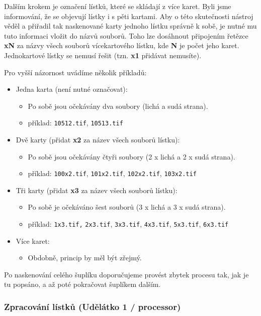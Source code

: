 Dalším krokem je označení lístků, které se skládají z více karet. Byli jsme informování, že se objevují lístky i s pěti kartami. Aby o této skutečnosti nástroj věděl a přiřadil tak naskenované karty jednoho lístku správně k sobě, je nutné mu tuto informaci vložit do názvů souborů. Toho lze dosáhnout připojením řetězce {\bf xN} za názvy všech souborů vícekartového lístku, kde {\bf N} je počet jeho karet. Jednokartové lístky se nemusí řešit (tzn. {\bf x1} přidávat nemusíte).

Pro vyšší názornost uvádíme několik příkladů:

\begin{itemize}
\item{Jedna karta (není nutné označovat):}
\begin{itemize}
\item{Po sobě jsou očekávány dva soubory (lichá a sudá strana).}
\item{příklad: {\tt 10512.tif}, {\tt 10513.tif}}
\end{itemize}
\item{Dvě karty (přidat {\bf x2} za název všech souborů lístku):}
\begin{itemize}
\item{Po sobě jsou očekávány čtyři soubory (2 x lichá a 2 x sudá strana).}
\item{příklad: {\tt 100x2.tif}, {\tt 101x2.tif}, {\tt 102x2.tif}, {\tt 103x2.tif}}
\end{itemize}
\item{Tři karty (přidat {\bf x3} za název všech souborů lístku):}
\begin{itemize}
\item{Po sobě je očekáváno šest souborů (3 x lichá a 3 x sudá strana).}
\item{příklad: {\tt 1x3.tif,} {\tt 2x3.tif}, {\tt 3x3.tif}, {\tt 4x3.tif}, {\tt 5x3.tif}, {\tt 6x3.tif}}
\end{itemize}
\item{Více karet:}
\begin{itemize}
\item{Obdobně, princip by měl být zřejmý.}
\end{itemize}
\end{itemize}

Po naskenování celého šuplíku doporučujeme provést zbytek procesu tak, jak je tu popsáno, a až poté pokračovat šuplíkem dalším.

\subsubsection{Zpracování lístků (Udělátko 1 / processor)}


